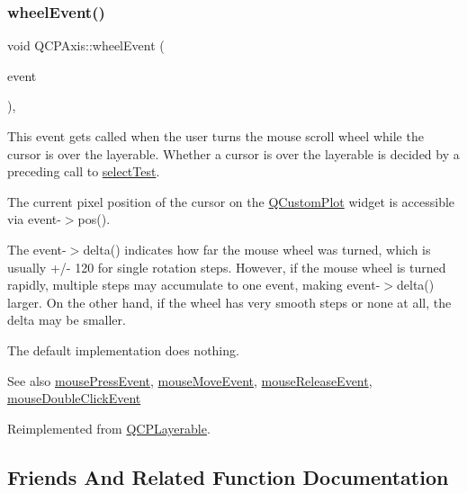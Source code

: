 \subsubsection{\texorpdfstring{wheel\+Event()}{wheelEvent()}}
{\footnotesize\ttfamily void Q\+C\+P\+Axis\+::wheel\+Event (\begin{DoxyParamCaption}\item[{Q\+Wheel\+Event $\ast$}]{event }\end{DoxyParamCaption})\hspace{0.3cm}{\ttfamily [protected]}, {\ttfamily [virtual]}}

This event gets called when the user turns the mouse scroll wheel while the cursor is over the layerable. Whether a cursor is over the layerable is decided by a preceding call to \hyperlink{class_q_c_p_axis_a63b7103c57fe9acfbce164334ea837f8}{select\+Test}.

The current pixel position of the cursor on the \hyperlink{class_q_custom_plot}{Q\+Custom\+Plot} widget is accessible via {\ttfamily event-\/$>$pos()}.

The {\ttfamily event-\/$>$delta()} indicates how far the mouse wheel was turned, which is usually +/-\/ 120 for single rotation steps. However, if the mouse wheel is turned rapidly, multiple steps may accumulate to one event, making {\ttfamily event-\/$>$delta()} larger. On the other hand, if the wheel has very smooth steps or none at all, the delta may be smaller.

The default implementation does nothing.

\begin{DoxySeeAlso}{See also}
\hyperlink{class_q_c_p_axis_ac89c068873ee9197a5d2af715bdc1105}{mouse\+Press\+Event}, \hyperlink{class_q_c_p_axis_a2a89a13440eec099fc2327c2672be0cd}{mouse\+Move\+Event}, \hyperlink{class_q_c_p_axis_a35663b938ad83e91c0b8e59dbc8c6b18}{mouse\+Release\+Event}, \hyperlink{class_q_c_p_layerable_a4171e2e823aca242dd0279f00ed2de81}{mouse\+Double\+Click\+Event} 
\end{DoxySeeAlso}


Reimplemented from \hyperlink{class_q_c_p_layerable_a47dfd7b8fd99c08ca54e09c362b6f022}{Q\+C\+P\+Layerable}.



\subsection{Friends And Related Function Documentation}
\mbox{\label{class_q_c_p_axis_acbf20ecb140f66c5fd1bc64ae0762990}} 
